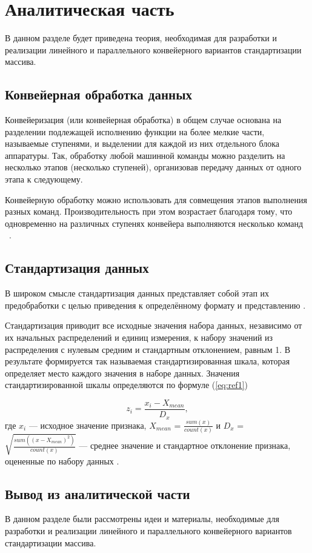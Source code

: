 \chapter{Аналитическая часть}

В данном разделе будет приведена теория, необходимая для разработки и реализации линейного и параллельного конвейерного вариантов стандартизации массива.

\section{Конвейерная обработка данных}

Конвейеризация (или конвейерная обработка) в общем случае основана на разделении подлежащей исполнению функции на более мелкие части, называемые ступенями, и выделении для каждой из них отдельного блока аппаратуры. Так, обработку любой машинной команды можно разделить на несколько этапов (несколько ступеней), организовав передачу данных от одного этапа к следующему. 

Конвейерную обработку можно использовать для совмещения этапов выполнения разных команд. Производительность при этом возрастает благодаря тому, что одновременно на различных ступенях конвейера выполняются несколько команд ~\cite{second_article}.


\section{Стандартизация данных}

В широком смысле стандартизация данных представляет собой этап их предобработки с целью приведения к определённому формату и представлению \cite{third_article}.

 Стандартизация приводит все исходные значения набора данных, независимо от их начальных распределений и единиц измерения, к набору значений из распределения с нулевым средним и стандартным отклонением, равным 1. В результате формируется так называемая стандартизированная шкала, которая определяет место каждого значения в наборе данных. Значения стандартизированной шкалы определяются по формуле (\ref{eq:ref1})
 
 \begin{equation}
 	z_i = \frac{x_i - X_{mean}}{D_x},\label{eq:ref1}
 \end{equation}
где $x_i$ — исходное значение признака, $X_{mean}$ =  $\frac{sum(x)}{count(x)}$ и $D_x$ = $\sqrt{\frac{sum((x - X_{mean})^2)}{count(x)}}$ — среднее значение и стандартное отклонение признака, оцененные по набору данных \cite{fourth_article}.




\section{Вывод из аналитической части}
В данном разделе были рассмотрены идеи и материалы, необходимые для разработки и реализации линейного и параллельного конвейерного вариантов стандартизации массива.

